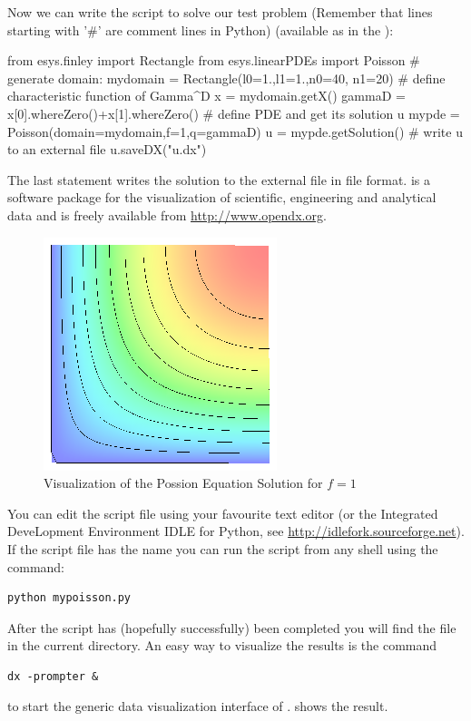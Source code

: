 Now we can write the script to solve our test problem (Remember that
lines starting with '\#' are comment lines in Python) (available as  
in the \ExampleDirectory):
\begin{python}
from esys.finley import Rectangle
from esys.linearPDEs import Poisson
# generate domain:
mydomain = Rectangle(l0=1.,l1=1.,n0=40, n1=20)
# define characteristic function of Gamma^D
x = mydomain.getX()
gammaD = x[0].whereZero()+x[1].whereZero()
# define PDE and get its solution u
mypde = Poisson(domain=mydomain,f=1,q=gammaD)
u = mypde.getSolution()
# write u to an external file
u.saveDX("u.dx")
\end{python}
The last statement writes the solution to the external file  in 
\OpenDX file format. \OpenDX is a software package
for the visualization of scientific, engineering and analytical data and is freely available
from \url{http://www.opendx.org}.

\begin{figure}
\centerline{\includegraphics[width=\figwidth]{FirstStepResult.eps}}
\caption{\OpenDX Visualization of the Possion Equation Solution for $f=1$}
\label{fig:FirstSteps.3}
\end{figure}

You can edit the script file using your favourite text editor (or the Integrated DeveLopment Environment IDLE
for Python, see \url{http://idlefork.sourceforge.net}). If the script file has the name   you can run the
script from any shell using the command:
\begin{verbatim} 
python mypoisson.py
\end{verbatim}
After the script has (hopefully successfully) been completed you will find the file  in the current
directory. An easy way to visualize the results is the command
\begin{verbatim} 
dx -prompter &
\end{verbatim}
to start the generic data visualization interface of \OpenDX.  shows the result.